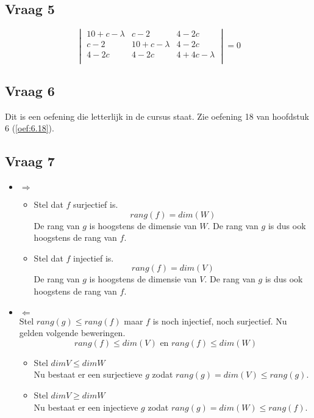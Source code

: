 \documentclass[lineaire_algebra_oplossingen.tex]{subfiles}
\begin{document}

\subsection{Vraag 5}
\[
\begin{vmatrix}
10+c-\lambda & c-2 & 4-2c\\
c-2 & 10+c-\lambda & 4-2c\\
4-2c & 4-2c & 4+4c-\lambda\\
\end{vmatrix}
=
0
\]

\subsection{Vraag 6}
Dit is een oefening die letterlijk in de cursus staat. Zie oefening 18 van hoofdstuk 6 (\ref{oef:6.18}).


\subsection{Vraag 7}
\begin{itemize}
\item $\Rightarrow$\\
\begin{itemize}
\item Stel dat $f$ surjectief is.\\
\[
rang(f) = dim(W)
\]
De rang van $g$ is hoogstens de dimensie van $W$. De rang van $g$ is dus ook hoogstens de rang van $f$. 
\item Stel dat $f$ injectief is.\\
\[
rang(f) = dim(V)
\]
De rang van $g$ is hoogstens de dimensie van $V$. De rang van $g$ is dus ook hoogstens de rang van $f$. 
\end{itemize}
\item $\Leftarrow$\\
Stel $rang(g) \le rang(f)$ maar $f$ is noch injectief, noch surjectief.
Nu gelden volgende beweringen.
\[
rang(f) \le dim(V) \text{ en } rang(f) \le dim(W)
\]
\begin{itemize}
\item Stel $dim V \le dim W$\\
Nu bestaat er een surjectieve $g$ zodat $rang(g) = dim(V) \le rang (g)$.
\item Stel $dim V \ge dim W$\\
Nu bestaat er een injectieve $g$ zodat $rang(g) = dim(W) \le rang(f)$.
\end{itemize}
\end{itemize}
\end{document}

